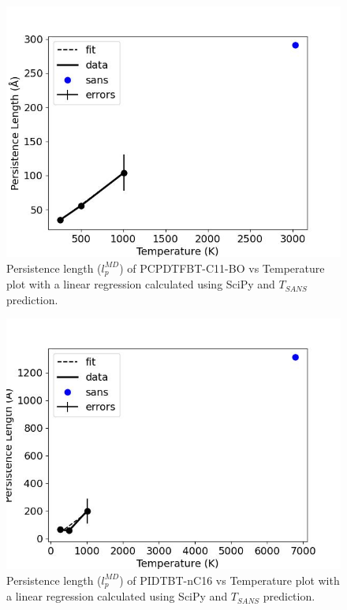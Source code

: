 \begin{figure}
    \centering
    \includegraphics[width=1\linewidth]{src/figures/pers_l_figs/untitled folder/pcpdtfbt/C11_plot.jpeg}
    \caption{Persistence length ($l_p^{MD}$) of PCPDTFBT-C11-BO vs Temperature plot with a linear regression calculated using SciPy \citep{2020SciPy-NMeth} and $T_{SANS}$ prediction.}
    \label{fig:C11_plot}
\end{figure}


\begin{figure}
    \centering
    \includegraphics[width=1\linewidth]{src/figures/pers_l_figs/untitled folder/idt/nc16_plot.jpeg}
    \caption{Persistence length ($l_p^{MD}$) of PIDTBT-nC16 vs Temperature plot with a linear regression calculated using SciPy \citep{2020SciPy-NMeth} and $T_{SANS}$ prediction.}
    \label{fig:idtnc16_plot}
\end{figure}

